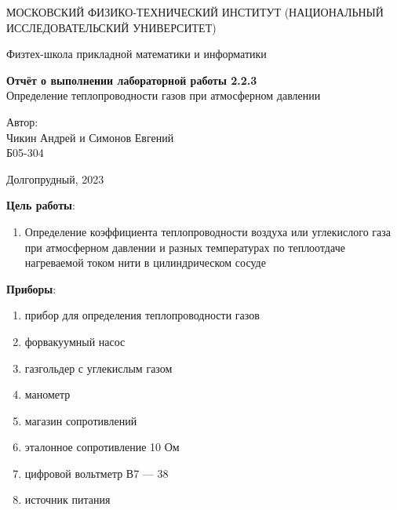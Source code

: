 \documentclass[a4paper,12pt]{article}
\begin{document}

\begin{titlepage}
  \begin{center}
    {\large МОСКОВСКИЙ ФИЗИКО-ТЕХНИЧЕСКИЙ ИНСТИТУТ (НАЦИОНАЛЬНЫЙ ИССЛЕДОВАТЕЛЬСКИЙ УНИВЕРСИТЕТ)}
  \end{center}
  \begin{center}
    {\large Физтех-школа прикладной математики и информатики}
  \end{center}

  \vspace{4.5cm}
  {\large
    \begin{center}
      {\bf Отчёт о выполнении лабораторной работы 2.2.3}\\
      Определение теплопроводности газов при атмосферном давлении
    \end{center}
  }
  \vspace{2cm}
  \begin{flushright}
    {\large Автор:\\ Чикин Андрей и Симонов Евгений\\
      \vspace{0.2cm}
      Б05-304}
  \end{flushright}
  \vspace{8cm}
  \begin{center}
    Долгопрудный, 2023
  \end{center}
\end{titlepage}

\tableofcontents
\listoffigures
\listoftables

\newpage

\textbf{Цель работы}:
\begin{enumerate}
  \item Определение коэффициента теплопроводности воздуха или углекислого газа при атмосферном давлении и разных температурах по теплоотдаче нагреваемой током нити в цилиндрическом сосуде
\end{enumerate}

\textbf{Приборы}:
\begin{enumerate}
  \item прибор для определения теплопроводности газов
  \item форвакуумный насос
  \item газгольдер с углекислым газом
  \item манометр
  \item магазин сопротивлений
  \item эталонное сопротивление 10 Ом
  \item цифровой вольтметр В7 --- 38
  \item источник питания
\end{enumerate}
\end{document}
